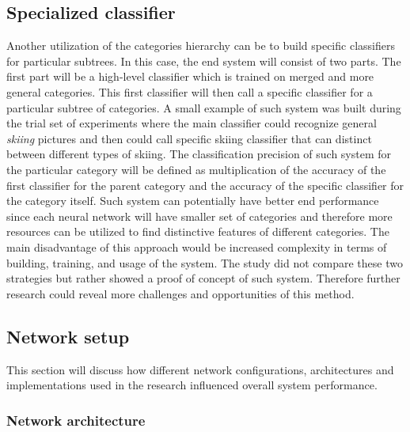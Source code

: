 \subsection{Specialized classifier}
Another utilization of the categories hierarchy can be to build specific classifiers for particular subtrees. In this case, the end system will consist of two parts. The first part will be a high-level classifier which is trained on merged and more general categories. This first classifier will then call a specific classifier for a particular subtree of categories. A small example of such system was built during the trial set of experiments where the main classifier could recognize general \textit{skiing} pictures and then could call specific skiing classifier that can distinct between different types of skiing.  The classification precision of such system for the particular category will be defined as multiplication of the accuracy of the first classifier for the parent category and the accuracy of the specific classifier for the category itself. Such system can potentially have better end performance since each neural network will have smaller set of categories and therefore more resources can be utilized to find distinctive features of different categories. The main disadvantage of this approach would be increased complexity in terms of building, training, and usage of the system. The study did not compare these two strategies but rather showed a proof of concept of such system. Therefore further research could reveal more challenges and opportunities of this method.

\subsection{Network setup}
This section will discuss how different network configurations, architectures and implementations used in the research influenced overall system performance.

\subsubsection{Network architecture}

